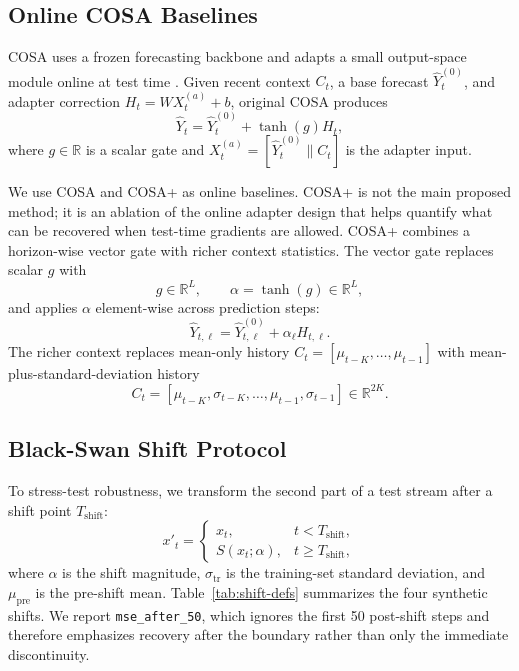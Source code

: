 \documentclass[10pt]{article}
\begin{document}
\subsection{Online COSA Baselines}
COSA uses a frozen forecasting backbone and adapts a small output-space module online at test time \cite{cosa2026}. Given recent context $C_t$, a base forecast $\hat{Y}^{(0)}_t$, and adapter correction $H_t = W X_t^{(a)} + b$, original COSA produces
\begin{equation}
  \hat{Y}_t = \hat{Y}^{(0)}_t + \tanh(g) H_t,
\end{equation}
where $g \in \mathbb{R}$ is a scalar gate and $X_t^{(a)}=[\hat{Y}^{(0)}_t \| C_t]$ is the adapter input.

We use COSA and COSA+ as online baselines. COSA+ is not the main proposed method; it is an ablation of the online adapter design that helps quantify what can be recovered when test-time gradients are allowed. COSA+ combines a horizon-wise vector gate with richer context statistics. The vector gate replaces scalar $g$ with
\begin{equation}
  g \in \mathbb{R}^{L}, \qquad \alpha=\tanh(g)\in\mathbb{R}^{L},
\end{equation}
and applies $\alpha$ element-wise across prediction steps:
\begin{equation}
  \hat{Y}_{t,\ell} = \hat{Y}^{(0)}_{t,\ell} + \alpha_{\ell} H_{t,\ell}.
\end{equation}
The richer context replaces mean-only history $C_t=[\mu_{t-K},\ldots,\mu_{t-1}]$ with mean-plus-standard-deviation history
\begin{equation}
  C_t=[\mu_{t-K},\sigma_{t-K},\ldots,\mu_{t-1},\sigma_{t-1}] \in \mathbb{R}^{2K}.
\end{equation}
\subsection{Black-Swan Shift Protocol}
To stress-test robustness, we transform the second part of a test stream after a shift point $T_{\mathrm{shift}}$:
\begin{equation}
  x'_t =
  \begin{cases}
    x_t, & t<T_{\mathrm{shift}}, \\
    S(x_t;\alpha), & t\geq T_{\mathrm{shift}},
  \end{cases}
\end{equation}
where $\alpha$ is the shift magnitude, $\sigma_{\mathrm{tr}}$ is the training-set standard deviation, and $\mu_{\mathrm{pre}}$ is the pre-shift mean. Table~\ref{tab:shift-defs} summarizes the four synthetic shifts. We report \texttt{mse\_after\_50}, which ignores the first 50 post-shift steps and therefore emphasizes recovery after the boundary rather than only the immediate discontinuity.
\end{document}
